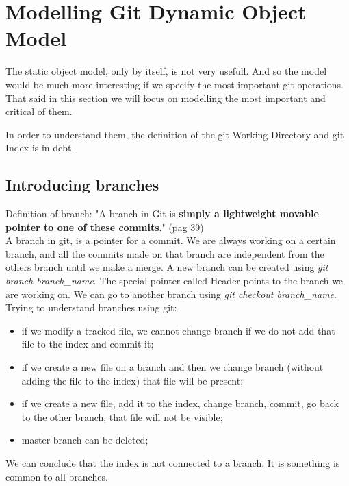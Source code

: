 \section {Modelling Git Dynamic Object Model}
The static object model, only by itself, 
is not very usefull. And so
the model would be much more interesting if we specify 
the most important git operations. That said in this
section we will focus on modelling the most important
and critical of them. \par

In order to understand them, the definition
of the git Working Directory and git Index is in debt.

\subsection{Introducing branches}
Definition of branch: "A branch in Git is {\bf simply a 
lightweight movable pointer to one of these commits}." \cite{progit} 
(pag 39)\\

A branch in git, is a pointer for a commit. We are always 
working on a certain branch, and all the commits made on 
that branch are independent from the others branch until we 
make a merge. A new branch can be created using 
\emph{git branch branch\_name}. The special pointer called Header 
points to the branch we are working on. We can go to another 
branch using \emph{git checkout branch\_name}.\\



Trying to understand branches using git:
\begin{itemize}
   \item if we modify a tracked file, we cannot change branch if we do not add that file to the index and commit it;
   \item if we create a new file on a branch and then we change branch (without adding the file to the index) that file will be present;
   \item if we create a new file, add it to the index, change branch, commit, go back to the other branch, that file will not be visible;
   \item master branch can be deleted;
\end{itemize}

We can conclude that the index is not connected to a branch. It is something is common to all branches.



